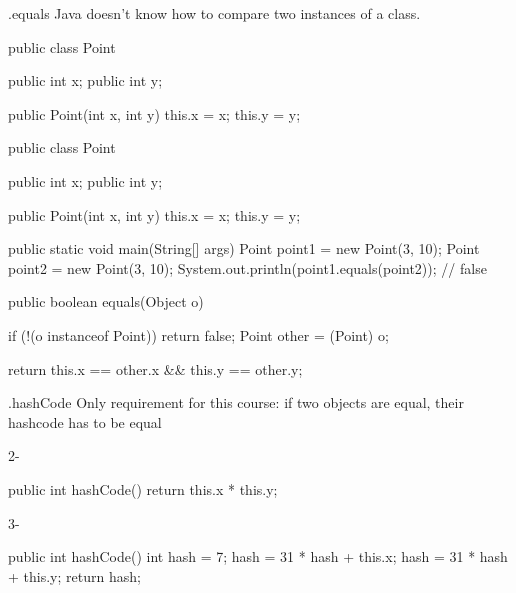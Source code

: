 \documentclass[week4]{csse2002}
\begin{document}
\begin{topic}{.equals}
Java doesn't know how to compare two instances of a class.

\begin{subtopic}{1}
\begin{java}
public class Point {
	public int x;
	public int y;

	public Point(int x, int y) {
		this.x = x;
		this.y = y;
	}
}
\end{java}
\end{subtopic}

\begin{subtopic}{2}
\begin{java}
public class Point {
	public int x;
	public int y;

	public Point(int x, int y) {
		this.x = x;
		this.y = y;
	}

	public static void main(String[] args) {
		Point point1 = new Point(3, 10);
		Point point2 = new Point(3, 10);
		System.out.println(point1.equals(point2)); // false
	}
}
\end{java}
\end{subtopic}

\begin{subtopic}{3}
\begin{java}
public boolean equals(Object o) {
	if (!(o instanceof Point)) {
		return false;
	}
	Point other = (Point) o;

	return this.x == other.x && this.y == other.y;
}
\end{java}
\end{subtopic}
\end{topic}

\begin{topic}{.hashCode}
Only requirement for this course: if two objects are equal, their
hashcode has to be equal

\begin{subtopic}{2-}
\begin{java}
public int hashCode() {
    return this.x * this.y;
}
\end{java}
\end{subtopic}

\begin{subtopic}{3-}
\begin{java}
public int hashCode() {
    int hash = 7;
    hash = 31 * hash + this.x;
    hash = 31 * hash + this.y;
    return hash;
}
\end{java}
\end{subtopic}
\end{topic}
\end{document}
